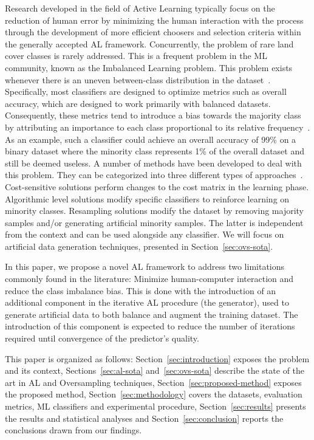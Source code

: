 \documentclass[parskip=full]{scrartcl}
\begin{document}
Research developed in the field of Active Learning typically focus on the reduction of human error
by minimizing the human interaction with the process through the development of more efficient
choosers and selection criteria within the generally accepted AL framework.  Concurrently, the
problem of rare land cover classes is rarely addressed. This is a frequent problem in the ML
community, known as the Imbalanced Learning problem.  This problem exists whenever there is an
uneven between-class distribution in the dataset~\cite{Chawla2004}. Specifically, most classifiers
are designed to optimize metrics such as overall accuracy, which are designed to work primarily with
balanced datasets. Consequently, these metrics tend to introduce a bias towards the majority class
by attributing an importance to each class proportional to its relative
frequency~\cite{Maxwell2018}. As an example, such a classifier could achieve an overall accuracy of
99\% on a binary dataset where the minority class represents 1\% of the overall dataset and still be
deemed useless. A number of methods have been developed to deal with this problem. They can be
categorized into three different types of approaches~\cite{Fernandez2013,Kaur2019}. Cost-sensitive
solutions perform changes to the cost matrix in the learning phase. Algorithmic level solutions
modify specific classifiers to reinforce learning on minority classes. Resampling solutions modify
the dataset by removing majority samples and/or generating artificial minority samples. The latter
is independent from the context and can be used alongside any classifier. We will focus on
artificial data generation techniques, presented in Section~\ref{sec:ovs-sota}.

In this paper, we propose a novel AL framework to address two limitations commonly found in the
literature: Minimize human-computer interaction and reduce the class imbalance bias. This is done
with the introduction of an additional component in the iterative AL procedure (the generator), used
to generate artificial data to both balance and augment the training dataset. The introduction of
this component is expected to reduce the number of iterations required until convergence of the
predictor's quality.

This paper is organized as follows: Section~\ref{sec:introduction} exposes the problem and its
context, Sections~\ref{sec:al-sota} and~\ref{sec:ovs-sota} describe the state of the art in AL and
Oversampling techniques, Section~\ref{sec:proposed-method} exposes the proposed method,
Section~\ref{sec:methodology} covers the datasets, evaluation metrics, ML classifiers and
experimental procedure, Section~\ref{sec:results} presents the results and statistical analyses and
Section~\ref{sec:conclusion} reports the conclusions drawn from our findings.
\end{document}

